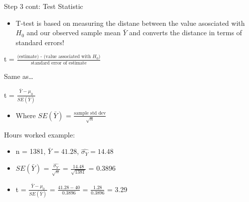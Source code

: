 \documentclass[
  8pt,
  ignorenonframetext,
  dvipsnames]{beamer}
\providecommand{\tightlist}{%
  \setlength{\itemsep}{0pt}\setlength{\parskip}{0pt}}
\let\olditem\item
\renewcommand{\item}{%
  \olditem\vspace{4pt}
}
\begin{document}
\begin{frame}{Step 3 cont: Test Statistic}
\protect\hypertarget{step-3-cont-test-statistic}{}

\begin{itemize}
\tightlist
\item
  T-test is based on measuring the distane between the value asosciated
  with \(H_0\) and our observed sample mean \(\bar{Y}\) and converts the
  distance in terms of standard errors!
\end{itemize}

\medskip

t =
\(\frac {\text{(estimate) - (value associated with }H_{0})} {\text{standard error of estimate}}\)

Same as\ldots{}

t = \(\frac {\bar{Y} - \mu_0} {SE(\bar{Y})}\)

\begin{itemize}
\tightlist
\item
  Where \(SE(\bar{Y})\) = \(\frac{\text{sample std dev}}{\sqrt{n}}\)
\end{itemize}

\medskip

Hours worked example:

\begin{itemize}
\tightlist
\item
  n = 1381, \(\bar{Y}=41.28\), \(\hat{\sigma_Y}=14.48\)
\item
  \(SE(\bar{Y})\) = \(\frac{\hat{\sigma_Y}}{\sqrt{n}}\) =
  \(\frac{14.48}{\sqrt{1381}}\) = 0.3896
\item
  t = \(\frac {\bar{Y} - \mu_0} {SE(\bar{Y})}\) =
  \(\frac {41.28 - 40} {0.3896}\) = \(\frac {1.28} {0.3896}\) = 3.29
\end{itemize}

\end{frame}
\end{document}
